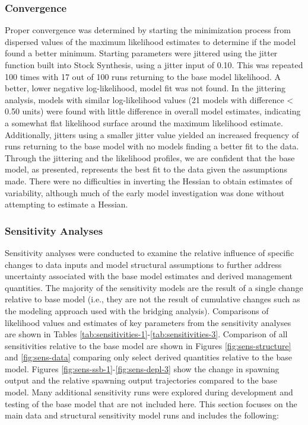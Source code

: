 \documentclass[11pt,
  english,
  letterpaper,
]{article}
\begin{document}
\hypertarget{convergence}{%
\subsubsection{Convergence}\label{convergence}}

Proper convergence was determined by starting the minimization process from dispersed values of the maximum likelihood estimates to determine if the model found a better minimum. Starting parameters were jittered using the jitter function built into Stock Synthesis, using a jitter input of 0.10. This was repeated 100 times with 17 out of 100 runs returning to the base model likelihood. A better, lower negative log-likelihood, model fit was not found. In the jittering analysis, models with similar log-likelihood values (21 models with difference \textless{} 0.50 units) were found with little difference in overall model estimates, indicating a somewhat flat likelihood surface around the maximum likelihood estimate. Additionally, jitters using a smaller jitter value yielded an increased frequency of runs returning to the base model with no models finding a better fit to the data. Through the jittering and the likelihood profiles, we are confident that the base model, as presented, represents the best fit to the data given the assumptions made. There were no difficulties in inverting the Hessian to obtain estimates of variability, although much of the early model investigation was done without attempting to estimate a Hessian.

\hypertarget{sensitivities}{%
\subsubsection{Sensitivity Analyses}\label{sensitivities}}

Sensitivity analyses were conducted to examine the relative influence of specific changes to data inputs and model structural assumptions to further address uncertainty associated with the base model estimates and derived management quantities. The majority of the sensitivity models are the result of a single change relative to base model (i.e., they are not the result of cumulative changes such as the modeling approach used with the bridging analysis). Comparisons of likelihood values and estimates of key parameters from the sensitivity analyses are shown in Tables \ref{tab:sensitivities-1}-\ref{tab:sensitivities-3}. Comparison of all sensitivities relative to the base model are shown in Figures \ref{fig:sens-structure} and \ref{fig:sens-data} comparing only select derived quantities relative to the base model. Figures \ref{fig:sens-ssb-1}-\ref{fig:sens-depl-3} show the change in spawning output and the relative spawning output trajectories compared to the base model. Many additional sensitivity runs were explored during development and testing of the base model that are not included here. This section focuses on the main data and structural sensitivity model runs and includes the following:
\end{document}

